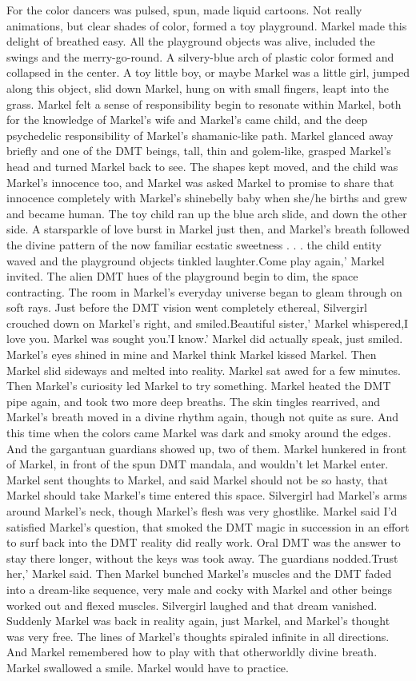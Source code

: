 \documentclass[12pt]{book}
\begin{document}
For the color dancers was pulsed, spun, made liquid cartoons. Not really animations, but clear shades of color, formed a toy playground. Markel made this delight of breathed easy. All the playground objects was alive, included the swings and the merry-go-round. A silvery-blue arch of plastic color formed and collapsed in the center. A toy little boy, or maybe Markel was a little girl, jumped along this object, slid down Markel, hung on with small fingers, leapt into the grass. Markel felt a sense of responsibility begin to resonate within Markel, both for the knowledge of Markel's wife and Markel's came child, and the deep psychedelic responsibility of Markel's shamanic-like path. Markel glanced away briefly and one of the DMT beings, tall, thin and golem-like, grasped Markel's head and turned Markel back to see. The shapes kept moved, and the child was Markel's innocence too, and Markel was asked Markel to promise to share that innocence completely with Markel's shinebelly baby when she/he births and grew and became human. The toy child ran up the blue arch slide, and down the other side. A starsparkle of love burst in Markel just then, and Markel's breath followed the divine pattern of the now familiar ecstatic sweetness . . .   the child entity waved and the playground objects tinkled laughter.Come play again,' Markel invited. The alien DMT hues of the playground begin to dim, the space contracting. The room in Markel's everyday universe began to gleam through on soft rays. Just before the DMT vision went completely ethereal, Silvergirl crouched down on Markel's right, and smiled.Beautiful sister,' Markel whispered,I love you. Markel was sought you.'I know.' Markel did actually speak, just smiled. Markel's eyes shined in mine and Markel think Markel kissed Markel. Then Markel slid sideways and melted into reality. Markel sat awed for a few minutes. Then Markel's curiosity led Markel to try something. Markel heated the DMT pipe again, and took two more deep breaths. The skin tingles rearrived, and Markel's breath moved in a divine rhythm again, though not quite as sure. And this time when the colors came Markel was dark and smoky around the edges. And the gargantuan guardians showed up, two of them. Markel hunkered in front of Markel, in front of the spun DMT mandala, and wouldn't let Markel enter. Markel sent thoughts to Markel, and said Markel should not be so hasty, that Markel should take Markel's time entered this space. Silvergirl had Markel's arms around Markel's neck, though Markel's flesh was very ghostlike. Markel said I'd satisfied Markel's question, that smoked the DMT magic in succession in an effort to surf back into the DMT reality did really work. Oral DMT was the answer to stay there longer, without the keys was took away. The guardians nodded.Trust her,' Markel said. Then Markel bunched Markel's muscles and the DMT faded into a dream-like sequence, very male and cocky with Markel and other beings worked out and flexed muscles. Silvergirl laughed and that dream vanished. Suddenly Markel was back in reality again, just Markel, and Markel's thought was very free. The lines of Markel's thoughts spiraled infinite in all directions. And Markel remembered how to play with that otherworldly divine breath. Markel swallowed a smile. Markel would have to practice.
\end{document}
